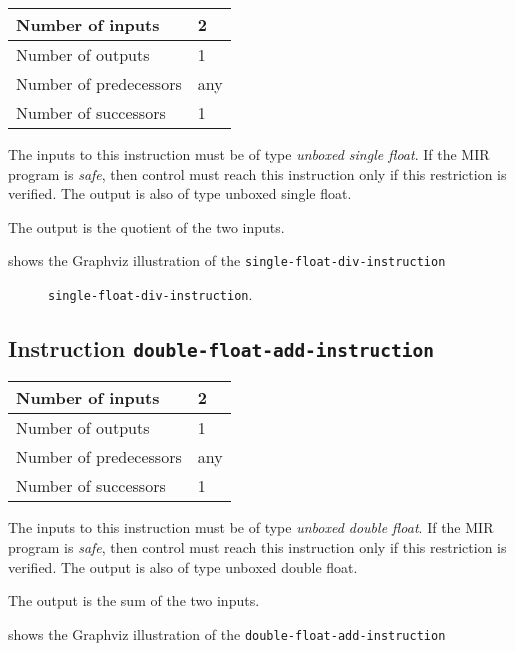 \begin{tabular}{|l|l|}
\hline
Number of inputs & 2\\
\hline
Number of outputs & 1\\
\hline
Number of predecessors & any\\
\hline
Number of successors & 1\\
\hline
\end{tabular}

The inputs to this instruction must be of type \emph{unboxed single
  float}.  If the MIR program is \emph{safe}, then control must reach
this instruction only if this restriction is verified.  The output is
also of type unboxed single float.

The output is the quotient of the two inputs.

 shows the Graphviz illustration of the
\texttt{single-float-div-instruction}

\begin{figure}
\begin{center}
\end{center}
\caption{\label{fig-single-float-div-instruction}
\texttt{single-float-div-instruction}.}
\end{figure}

\subsection{Instruction \texttt{double-float-add-instruction}}
\label{mir-instruction-double-float-add}

\begin{tabular}{|l|l|}
\hline
Number of inputs & 2\\
\hline
Number of outputs & 1\\
\hline
Number of predecessors & any\\
\hline
Number of successors & 1\\
\hline
\end{tabular}

The inputs to this instruction must be of type \emph{unboxed double
  float}.  If the MIR program is \emph{safe}, then control must reach
this instruction only if this restriction is verified.  The output is
also of type unboxed double float.

The output is the sum of the two inputs.

 shows the Graphviz illustration of the
\texttt{double-float-add-instruction}


